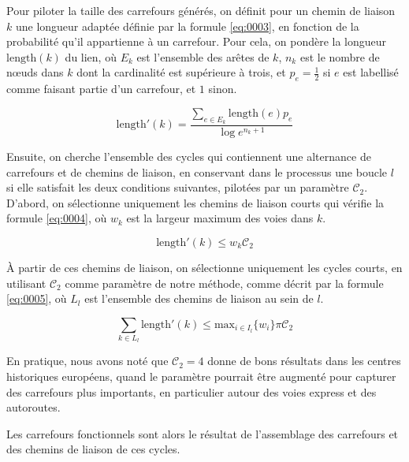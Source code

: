 \newpar{}

Pour piloter la taille des carrefours générés, on définit pour un chemin de liaison $k$ une longueur adaptée définie par la formule \ref{eq:0003}, en fonction de la probabilité qu'il appartienne à un carrefour. Pour cela, on pondère la longueur $\mathrm{length}(k)$ du lien, où $E_k$ est l'ensemble des arêtes de $k$, $n_k$ est le nombre de nœuds dans $k$ dont la cardinalité est supérieure à trois, et $p_e=\frac{1}{2}$ si $e$ est labellisé comme faisant partie d'un carrefour, et $1$ sinon.

\begin{equation}
 \mathrm{length}'(k) = \frac{\sum_{e \in E_k}\mathrm{length}(e) p_e}{\log e^{n_k +1}}
 \label{eq:0003}
\end{equation}

Ensuite, on cherche l'ensemble des cycles qui contiennent une alternance de carrefours et de chemins de liaison, en conservant dans le processus une boucle $l$ si elle satisfait les deux conditions suivantes, pilotées par un paramètre $\mathcal{C}_2$.
D'abord, on sélectionne uniquement les chemins de liaison courts qui vérifie la formule \ref{eq:0004}, où $w_k$ est la largeur maximum des voies dans $k$.

\begin{equation}
\mathrm{length}'(k) \leq w_k \mathcal{C}_2
\label{eq:0004}
\end{equation}

À partir de ces chemins de liaison, on sélectionne uniquement les cycles courts, en utilisant $\mathcal{C}_2$ comme paramètre de notre méthode, comme décrit par la formule \ref{eq:0005}, où $L_l$ est l'ensemble des chemins de liaison au sein de $l$.

\begin{equation}
\sum_{k \in L_l} \mathrm{length}'(k) \leq \mathrm{max}_{i \in I_l}\{w_i\} \pi \mathcal{C}_2
\label{eq:0005}
\end{equation}

En pratique, nous avons noté que $\mathcal{C}_2=4$ donne de bons résultats dans les centres historiques européens, quand le paramètre pourrait être augmenté pour capturer des carrefours plus importants, en particulier autour des voies express et des autoroutes.

\newpar{}

Les carrefours fonctionnels sont alors le résultat de l'assemblage des carrefours et des chemins de liaison de ces cycles.

\newpar{}

